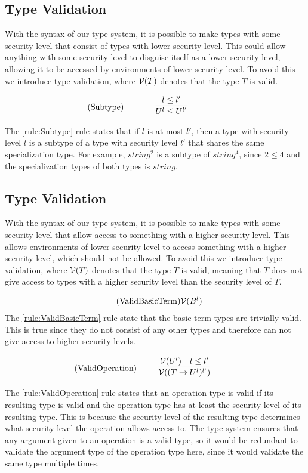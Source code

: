 \subsection{Type Validation}
With the syntax of our type system, it is possible to make types with some security level that consist of types with lower security level.
This could allow anything with some security level to disguise itself as a lower security level, allowing it to be accessed by environments of lower security level.
To avoid this we introduce type validation, where $\mathcal{V}(T)$ denotes that the type $T$ is valid.

\begin{align*}
\tag{Subtype}\label{rule:Subtype} &\infrule{l\leq l'}{U^l\leq U^{l'}}
\end{align*}
The \ref{rule:Subtype} rule states that if $l$ is at most $l'$, then a type with security level $l$ is a subtype of a type with security level $l'$ that shares the same specialization type.
For example, $string^2$ is a subtype of $string^4$, since $2\leq4$ and the specialization types of both types is $string$.

\subsection{Type Validation}
With the syntax of our type system, it is possible to make types with some security level that allow access to something with a higher security level.
This allows environments of lower security level to access something with a higher security level, which should not be allowed.
To avoid this we introduce type validation, where $\mathcal{V}(T)$ denotes that the type $T$ is valid, meaning that $T$ does not give access to types with a higher security level than the security level of $T$.

\begin{align*}
    \tag{ValidBasicTerm}\label{rule:ValidBasicTerm} &\mathcal{V}(B^l)
\end{align*}
The \ref{rule:ValidBasicTerm} rule state that the basic term types are trivially valid.
This is true since they do not consist of any other types and therefore can not give access to higher security levels.

\begin{align*}
    \tag{ValidOperation}\label{rule:ValidOperation} &\infrule{\valid{U^l}\quad l\leq l'}{\valid{(T\ra U^l)^{l'}}}
\end{align*}
The \ref{rule:ValidOperation} rule states that an operation type is valid if its resulting type is valid and the operation type has at least the security level of its resulting type.
This is because the security level of the resulting type determines what security level the operation allows access to.
The type system ensures that any argument given to an operation is a valid type, so it would be redundant to validate the argument type of the operation type here, since it would validate the same type multiple times.


